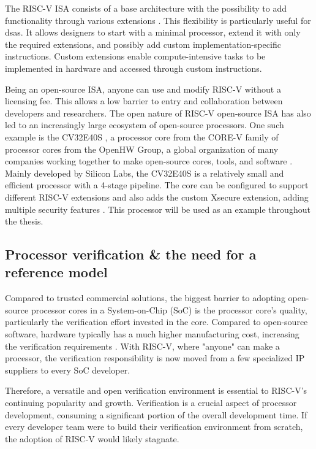The RISC-V ISA consists of a base architecture with the possibility to add functionality through various extensions \cite{watermanRISCVInstructionSet2019}. This flexibility is particularly useful for \acrshort{dsa}s. It allows designers to start with a minimal processor, extend it with only the required extensions, and possibly add custom implementation-specific instructions. Custom extensions enable compute-intensive tasks to be implemented in hardware and accessed through custom instructions. 

Being an open-source ISA, anyone can use and modify RISC-V without a licensing fee. This allows a low barrier to entry and collaboration between developers and researchers. The open nature of RISC-V open-source ISA has also led to an increasingly large ecosystem of open-source processors. One such example is the CV32E40S \cite{openhwgroupCv32e40s2024}, a processor core from the CORE-V family of processor cores from the OpenHW Group, a global organization of many companies working together to make open-source cores, tools, and software \cite{taylorAdvancedRISCVVerification2023}. Mainly developed by Silicon Labs, the CV32E40S is a relatively small and efficient processor with a 4-stage pipeline. The core can be configured to support different RISC-V extensions and also adds the custom Xsecure extension, adding multiple security features \cite{openhwgroupIntroductionCOREVCV32E40S2023}. This processor will be used as an example throughout the thesis.





\subsection{Processor verification \& the need for a reference model}

Compared to trusted commercial solutions, the biggest barrier to adopting open-source processor cores in a System-on-Chip (SoC) is the processor core's quality, particularly the verification effort invested in the core. Compared to open-source software, hardware typically has a much higher manufacturing cost, increasing the verification requirements \cite{kevinmcdermottOpenHWIndustrialGradeVerification2022}.
With RISC-V, where "anyone" can make a processor, the verification responsibility is now moved from a few specialized IP suppliers to every SoC developer. 

Therefore, a versatile and open verification environment is essential to RISC-V's continuing popularity and growth. Verification is a crucial aspect of processor development, consuming a significant portion of the overall development time. If every developer team were to build their verification environment from scratch, the adoption of RISC-V would likely stagnate.

